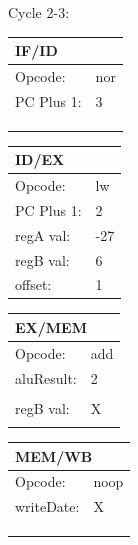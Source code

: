 \documentclass[12pt, letterpaper]{article}
\begin{document}
Cycle 2-3:
\begin{table}[H]
    \begin{tabular}{|ll|}
    \hline
    \multicolumn{2}{|l|}{IF/ID}            \\ \hline
    \multicolumn{1}{|l|}{Opcode:}    & nor \\ \hline
    \multicolumn{1}{|l|}{PC Plus 1:} & 3   \\ \hline
    \multicolumn{1}{|l|}{}           &     \\ \hline
    \multicolumn{1}{|l|}{}           &     \\ \hline
    \multicolumn{1}{|l|}{}           &     \\ \hline
    \end{tabular}
    \begin{tabular}{|ll|}
    \hline
    \multicolumn{2}{|l|}{ID/EX}             \\ \hline
    \multicolumn{1}{|l|}{Opcode:}    & lw \\ \hline
    \multicolumn{1}{|l|}{PC Plus 1:} & 2    \\ \hline
    \multicolumn{1}{|l|}{regA val:}  & -27    \\ \hline
    \multicolumn{1}{|l|}{regB val:}  & 6    \\ \hline
    \multicolumn{1}{|l|}{offset:}    & 1    \\ \hline
    \end{tabular}
    \begin{tabular}{|ll|}
    \hline
    \multicolumn{2}{|l|}{EX/MEM}            \\ \hline
    \multicolumn{1}{|l|}{Opcode:}    & add \\ \hline
    \multicolumn{1}{|l|}{aluResult:} & 2    \\ \hline
    \multicolumn{1}{|l|}{}           &      \\ \hline
    \multicolumn{1}{|l|}{regB val:}  & X    \\ \hline
    \multicolumn{1}{|l|}{}           &      \\ \hline
    \end{tabular}
    \begin{tabular}{|ll|}
    \hline
    \multicolumn{2}{|l|}{MEM/WB}            \\ \hline
    \multicolumn{1}{|l|}{Opcode:}    & noop \\ \hline
    \multicolumn{1}{|l|}{writeDate:} & X    \\ \hline
    \multicolumn{1}{|l|}{}           &      \\ \hline
    \multicolumn{1}{|l|}{}           &      \\ \hline
    \multicolumn{1}{|l|}{}           &      \\ \hline
    \end{tabular}
\end{table}
\end{document}
